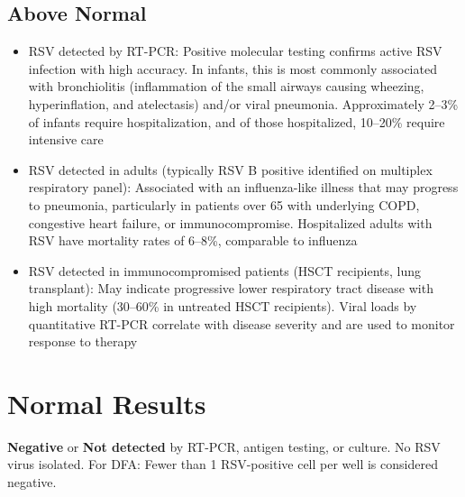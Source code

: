 \subsection*{Above Normal}
\begin{itemize}
  \item RSV detected by RT-PCR: Positive molecular testing confirms active RSV infection with high accuracy. In infants, this is most commonly associated with bronchiolitis (inflammation of the small airways causing wheezing, hyperinflation, and atelectasis) and/or viral pneumonia. Approximately 2--3\% of infants require hospitalization, and of those hospitalized, 10--20\% require intensive care
  \item RSV detected in adults (typically RSV B positive identified on multiplex respiratory panel): Associated with an influenza-like illness that may progress to pneumonia, particularly in patients over 65 with underlying COPD, congestive heart failure, or immunocompromise. Hospitalized adults with RSV have mortality rates of 6--8\%, comparable to influenza
  \item RSV detected in immunocompromised patients (HSCT recipients, lung transplant): May indicate progressive lower respiratory tract disease with high mortality (30--60\% in untreated HSCT recipients). Viral loads by quantitative RT-PCR correlate with disease severity and are used to monitor response to therapy
\end{itemize}

\section*{Normal Results}
\textbf{Negative} or \textbf{Not detected} by RT-PCR, antigen testing, or culture. No RSV virus isolated. For DFA: Fewer than 1 RSV-positive cell per well is considered negative.

